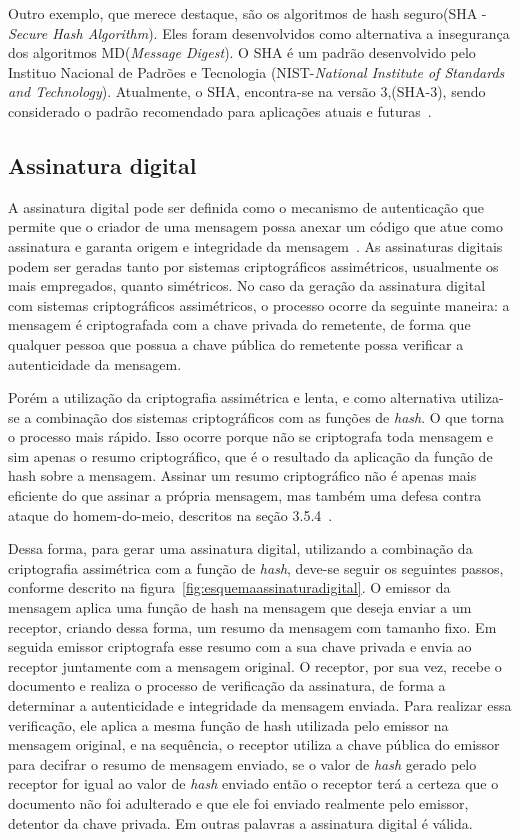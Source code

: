 Outro exemplo, que merece destaque, são os algoritmos de hash seguro(SHA - \emph{Secure Hash Algorithm}). Eles foram desenvolvidos como alternativa a insegurança dos algoritmos MD(\emph{Message Digest}). O SHA é um padrão desenvolvido pelo Instituo Nacional de Padrões e Tecnologia (NIST-\emph{National Institute of Standards and Technology}). Atualmente, o SHA, encontra-se na versão 3,(SHA-3), sendo considerado o padrão recomendado para aplicações atuais e futuras~\cite{forouzan2013redes}.

\subsection{Assinatura digital}

A assinatura digital pode ser definida como o mecanismo de autenticação que permite que o criador de uma mensagem possa anexar um código que atue como assinatura e garanta origem e integridade da mensagem~\cite{stallings2008}. As assinaturas digitais podem ser geradas tanto por sistemas criptográficos assimétricos, usualmente os mais empregados, quanto simétricos. No caso da geração da assinatura digital com sistemas criptográficos assimétricos, o processo ocorre da seguinte maneira: a mensagem é criptografada com a chave privada do remetente, de forma que qualquer pessoa que possua a chave pública do remetente possa verificar a autenticidade da mensagem.

Porém a utilização da criptografia assimétrica e lenta, e como alternativa utiliza-se a combinação dos sistemas criptográficos com as funções de \emph{hash}. O que torna o processo mais rápido. Isso ocorre porque não se criptografa toda mensagem e sim apenas o resumo criptográfico, que é o resultado da aplicação da função de hash sobre a mensagem. Assinar um resumo criptográfico não é apenas mais eficiente do que assinar a própria mensagem, mas também uma defesa contra ataque do homem-do-meio, descritos na seção 3.5.4~\cite{goodrich2013}.

Dessa forma, para gerar uma assinatura digital, utilizando a combinação da criptografia assimétrica com a função de \emph{hash}, deve-se seguir os seguintes passos, conforme descrito na figura~\ref{fig:esquemaassinaturadigital}. O emissor da mensagem aplica uma função de hash na mensagem que deseja enviar a um receptor, criando dessa forma, um resumo da mensagem com tamanho fixo. Em seguida emissor criptografa esse resumo com a sua chave privada e envia ao receptor juntamente com a mensagem original. O receptor, por sua vez, recebe o documento e realiza o processo de verificação da assinatura, de forma a determinar a autenticidade e integridade da mensagem enviada. Para realizar essa verificação, ele aplica a mesma função de hash utilizada pelo emissor na mensagem original, e na sequência, o receptor utiliza a chave pública do emissor para decifrar o resumo de mensagem enviado, se o valor de \emph{hash} gerado pelo receptor  for igual ao valor de \emph{hash} enviado então o receptor terá a certeza que o documento não foi adulterado e que ele foi enviado realmente pelo emissor, detentor da chave privada. Em outras palavras a assinatura digital é válida.


